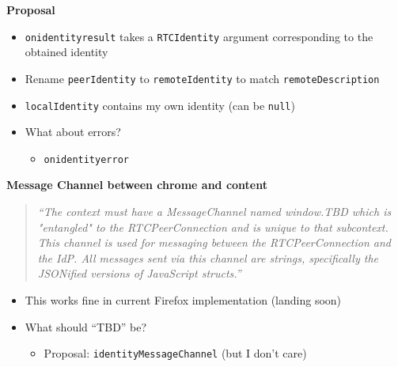 \documentclass[helvetica]{seminar}
\newcommand{\heading}[1]{%
  \begin{center} 
    \large\bf 
    #1 
  \end{center} 
  \vspace{.4 in}}
\begin{document}
\begin{slide}
\heading{Proposal}

\begin{itemize}
\item \verb^onidentityresult^ takes a \verb^RTCIdentity^ argument corresponding to the obtained identity
\item Rename \verb^peerIdentity^ to \verb^remoteIdentity^ to match \verb^remoteDescription^
\item \verb^localIdentity^ contains my own identity (can be \verb^null^)
\item What about errors?
  \begin{itemize}
    \item \verb^onidentityerror^
  \end{itemize}
\end{itemize}
\end{slide}

\begin{slide}
\heading{Message Channel between chrome and content}

\begin{quote}
\emph{``The context must have a MessageChannel named window.TBD which is "entangled" to the RTCPeerConnection and is unique to that subcontext. This channel is used for messaging between the RTCPeerConnection and the IdP. All messages sent via this channel are strings, specifically the JSONified versions of JavaScript structs.''}\end{quote}

\begin{itemize}
\item This works fine in current Firefox implementation (landing soon)
\item What should ``TBD'' be?
\begin{itemize}
\item Proposal: \verb^identityMessageChannel^ (but I don't care)
\end{itemize}
\end{itemize}
\end{slide}
\end{document}
